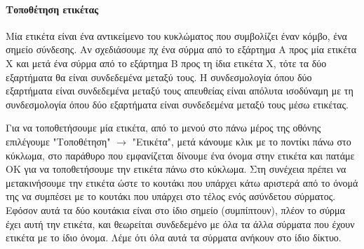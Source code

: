 \documentclass[a4paper]{article}
\begin{document}
\begin{figure}
  \begin{center}
    \label{fig:kicad-main}
  \end{center}
\end{figure}

\paragraph{Τοποθέτηση ετικέτας}
Μία ετικέτα είναι ένα αντικείμενο του κυκλώματος που συμβολίζει έναν κόμβο, ένα σημείο σύνδεσης. Αν σχεδιάσουμε πχ ένα σύρμα από το εξάρτημα Α προς μία ετικέτα Χ και μετά ένα σύρμα από το εξάρτημα Β προς τη ίδια ετικέτα Χ, τότε τα δύο εξαρτήματα θα είναι συνδεδεμένα μεταξύ τους. Η συνδεσμολογία όπου δύο εξαρτήματα είναι συνδεδεμένα μεταξύ τους απευθείας είναι απόλυτα ισοδύναμη με τη συνδεσμολογία όπου δύο εξαρτήματα είναι συνδεδεμένα μεταξύ τους μέσω ετικέτας.

Για να τοποθετήσουμε μία ετικέτα, από το μενού στο πάνω μέρος της οθόνης επιλέγουμε "Τοποθέτηση" $\rightarrow$ "Ετικέτα", μετά κάνουμε κλικ με το ποντίκι πάνω στο κύκλωμα, στο παράθυρο που εμφανίζεται δίνουμε ένα όνομα στην ετικέτα και πατάμε ΟΚ για να τοποθετήσουμε την ετικέτα πάνω στο κύκλωμα. Στη συνέχεια πρέπει να μετακινήσουμε την ετικέτα ώστε το κουτάκι που υπάρχει κάτω αριστερά από το όνομά της να συμπέσει με το κουτάκι που υπάρχει στο τέλος ενός ασύνδετου σύρματος. Εφόσον αυτά τα δύο κουτάκια είναι στο ίδιο σημείο (συμπίπτουν), πλέον το σύρμα έχει αυτή την ετικέτα, και θεωρείται συνδεδεμένο με όλα τα άλλα σύρματα που έχουν ετικέτα με το ίδιο όνομα. Λέμε ότι όλα αυτά τα σύρματα ανήκουν στο ίδιο δίκτυο.

\begin{figure}
  \begin{center}
    \label{fig:kicad-main}
  \end{center}
\end{figure}

\begin{figure}
  \begin{center}
    \label{fig:kicad-main}
  \end{center}
\end{figure}
\end{document}

